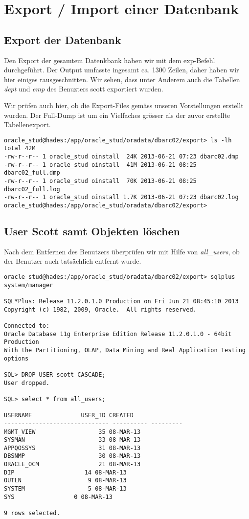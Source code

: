 \documentclass[11pt,a4paper,parskip=half]{scrartcl}
\begin{document}
\newpage
\section{Export / Import einer Datenbank}
\subsection{Export der Datenbank}
Den Export der gesamtem Datenkbank haben wir mit dem exp-Befehl durchgeführt. Der Output umfasste ingesamt ca. 1300 Zeilen, daher haben wir hier einiges rausgeschnitten. Wir sehen, dass unter Anderem auch die Tabellen \emph{dept} und \emph{emp} des Benuzters scott exportiert wurden.


Wir prüfen auch hier, ob die Export-Files gemäss unseren Vorstellungen erstellt wurden. Der Full-Dump ist um ein Vielfaches grösser als der zuvor erstellte Tabellenexport.
\begin{lstlisting}
oracle_stud@hades:/app/oracle_stud/oradata/dbarc02/export> ls -lh
total 42M
-rw-r--r-- 1 oracle_stud oinstall  24K 2013-06-21 07:23 dbarc02.dmp
-rw-r--r-- 1 oracle_stud oinstall  41M 2013-06-21 08:25 dbarc02_full.dmp
-rw-r--r-- 1 oracle_stud oinstall  70K 2013-06-21 08:25 dbarc02_full.log
-rw-r--r-- 1 oracle_stud oinstall 1.7K 2013-06-21 07:23 dbarc02.log
oracle_stud@hades:/app/oracle_stud/oradata/dbarc02/export>
\end{lstlisting}

\subsection{User Scott samt Objekten löschen}
Nach dem Entfernen des Benutzers überprüfen wir mit Hilfe von \emph{all\_users}, ob der Benutzer auch tatsächlich entfernt wurde.
\begin{lstlisting}
oracle_stud@hades:/app/oracle_stud/oradata/dbarc02/export> sqlplus system/manager

SQL*Plus: Release 11.2.0.1.0 Production on Fri Jun 21 08:45:10 2013
Copyright (c) 1982, 2009, Oracle.  All rights reserved.

Connected to:
Oracle Database 11g Enterprise Edition Release 11.2.0.1.0 - 64bit Production
With the Partitioning, OLAP, Data Mining and Real Application Testing options

SQL> DROP USER scott CASCADE;
User dropped.

SQL> select * from all_users;

USERNAME			  USER_ID CREATED
------------------------------ ---------- ---------
MGMT_VIEW			       35 08-MAR-13
SYSMAN				       33 08-MAR-13
APPQOSSYS			       31 08-MAR-13
DBSNMP				       30 08-MAR-13
ORACLE_OCM			       21 08-MAR-13
DIP				       14 08-MAR-13
OUTLN					9 08-MAR-13
SYSTEM					5 08-MAR-13
SYS					0 08-MAR-13

9 rows selected.
\end{lstlisting}
\end{document}
